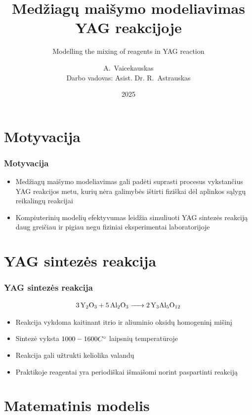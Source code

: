 \documentclass{beamer}
\date{2025}
\title[]{Medžiagų maišymo modeliavimas YAG reakcijoje}
\subtitle{Modelling the mixing of reagents in YAG reaction}
\author[Arnas Vaicekauskas]
{
    A.~Vaicekauskas\inst{1}\\ 
    \small Darbo vadovas: Asist. Dr. R.~Astrauskas\inst{1}
}
\institute[MIF]
{
  \inst{1}
  Matematikos ir informatikos fakultetas\\
  Vilniaus Universitetas
}
\begin{document}
\frame{\titlepage}

\frame{
    \tableofcontents[currentsubsection,subsectionstyle=show]
}

\section{Motyvacija}

\begin{frame}
\frametitle{Motyvacija}
 
    \begin{itemize}
        \item Medžiagų maišymo modeliavimas gali padėti suprasti procesus vykstančius YAG reakcijos metu, kurių nėra galimybės ištirti fiziškai dėl aplinkos sąlygų reikalingų reakcijai
        \item Kompiuterinių modelių efektyvumas leidžia simuliuoti YAG sintezės reakciją daug greičiau ir pigiau negu fiziniai eksperimentai laboratorijoje
    \end{itemize}

\end{frame}

\section{YAG sintezės reakcija}

\begin{frame}
    \frametitle{YAG sintezės reakcija}

    \centering
    \begin{align*}
        \ce{3Y_2O_3 + 5Al_2O_3 -> 2Y_3Al_5O_{12}}
    \end{align*}    

    \begin{itemize}
        \item Reakcija vykdoma kaitinant itrio ir aliuminio oksidų homogeninį mišinį
        \item Sintezė vyksta $1000-1600 C\degree$ laipsnių temperatūroje
        \item Reakcija gali užtrukti keliolika valandų
        \item Praktikoje reagentai yra periodiškai išmaišomi norint paspartinti reakciją 
    \end{itemize}

\end{frame}

\section{Matematinis modelis}
\end{document}

